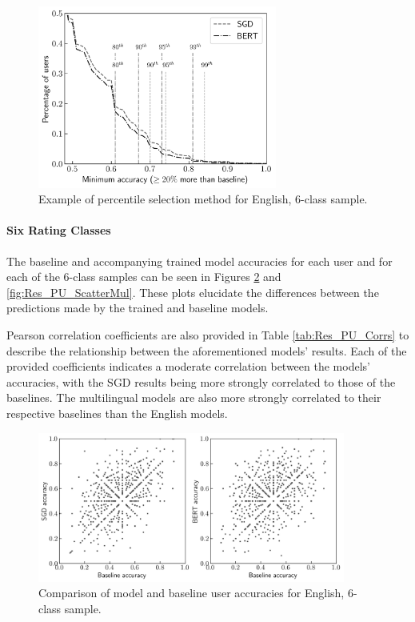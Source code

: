 \begin{figure}[ht]
    \centering
    \includegraphics[width=0.7\textwidth]{figures/06_results/02_pu/03_complex/eng_6.png}
    \caption{Example of percentile selection method for English, 6-class sample.}
    \label{fig:Res_PU_PctsExample}
\end{figure}

\paragraph{Six Rating Classes}

The baseline and accompanying trained model accuracies for each user and for each of the 6-class samples can be seen in Figures \ref{fig:Res_PU_ScatterEng} and \ref{fig:Res_PU_ScatterMul}. These plots elucidate the differences between the predictions made by the trained and baseline models.

Pearson correlation coefficients are also provided in Table \ref{tab:Res_PU_Corrs} to describe the relationship between the aforementioned models' results. Each of the provided coefficients indicates a moderate correlation between the models' accuracies, with the SGD results being more strongly correlated to those of the baselines. The multilingual models are also more strongly correlated to their respective baselines than the English models.

\begin{figure}[ht]
    \centering
    \includegraphics[width=0.9\textwidth]{figures/06_results/02_pu/04_scatter/eng_6.png}
    \caption{Comparison of model and baseline user accuracies for English, 6-class sample.}
    \label{fig:Res_PU_ScatterEng}
\end{figure}

